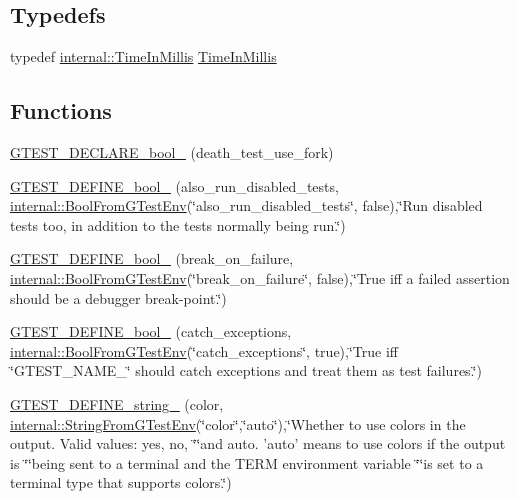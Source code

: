 \subsection*{Typedefs}
\begin{DoxyCompactItemize}
\item 
typedef \hyperlink{namespacetesting_1_1internal_a5eed833eddf9ea8ca45546c125f4ef0c}{internal\-::\-Time\-In\-Millis} \hyperlink{namespacetesting_a992de1d091ce660f451d1e8b3ce30fd6}{Time\-In\-Millis}
\end{DoxyCompactItemize}
\subsection*{Functions}
\begin{DoxyCompactItemize}
\item 
\hyperlink{namespacetesting_a534f0743e7c42c55d27dcd0dd3d38f18}{G\-T\-E\-S\-T\-\_\-\-D\-E\-C\-L\-A\-R\-E\-\_\-bool\-\_\-} (death\-\_\-test\-\_\-use\-\_\-fork)
\item 
\hyperlink{namespacetesting_aaead7d1aa21cf4a222e10e4c91c21ee5}{G\-T\-E\-S\-T\-\_\-\-D\-E\-F\-I\-N\-E\-\_\-bool\-\_\-} (also\-\_\-run\-\_\-disabled\-\_\-tests, \hyperlink{namespacetesting_1_1internal_a1055088bb9b867e1b7b8f096f519d7c5}{internal\-::\-Bool\-From\-G\-Test\-Env}(\char`\"{}also\-\_\-run\-\_\-disabled\-\_\-tests\char`\"{}, false),\char`\"{}Run disabled tests too, in addition to the tests normally being run.\char`\"{})
\item 
\hyperlink{namespacetesting_a5c9316c2f726f836c50fcfc1065d718c}{G\-T\-E\-S\-T\-\_\-\-D\-E\-F\-I\-N\-E\-\_\-bool\-\_\-} (break\-\_\-on\-\_\-failure, \hyperlink{namespacetesting_1_1internal_a1055088bb9b867e1b7b8f096f519d7c5}{internal\-::\-Bool\-From\-G\-Test\-Env}(\char`\"{}break\-\_\-on\-\_\-failure\char`\"{}, false),\char`\"{}True iff a failed assertion should be a debugger break-\/point.\char`\"{})
\item 
\hyperlink{namespacetesting_a16f63f28356f1843888013487da9f89d}{G\-T\-E\-S\-T\-\_\-\-D\-E\-F\-I\-N\-E\-\_\-bool\-\_\-} (catch\-\_\-exceptions, \hyperlink{namespacetesting_1_1internal_a1055088bb9b867e1b7b8f096f519d7c5}{internal\-::\-Bool\-From\-G\-Test\-Env}(\char`\"{}catch\-\_\-exceptions\char`\"{}, true),\char`\"{}True iff \char`\"{}G\-T\-E\-S\-T\-\_\-\-N\-A\-M\-E\-\_\-\char`\"{} should catch exceptions and treat them as test failures.\char`\"{})
\item 
\hyperlink{namespacetesting_a00b4a4eabdef5927208aeabd81220069}{G\-T\-E\-S\-T\-\_\-\-D\-E\-F\-I\-N\-E\-\_\-string\-\_\-} (color, \hyperlink{namespacetesting_1_1internal_a0967cbf18fb1594f82512d8d822aba21}{internal\-::\-String\-From\-G\-Test\-Env}(\char`\"{}color\char`\"{},\char`\"{}auto\char`\"{}),\char`\"{}Whether to use colors in the output.  Valid values\-: yes, no, \char`\"{}\char`\"{}and auto.  'auto' means to use colors if the output is \char`\"{}\char`\"{}being sent to a terminal and the T\-E\-R\-M environment variable \char`\"{}\char`\"{}is set to a terminal type that supports colors.\char`\"{})

\end{DoxyCompactItemize}
